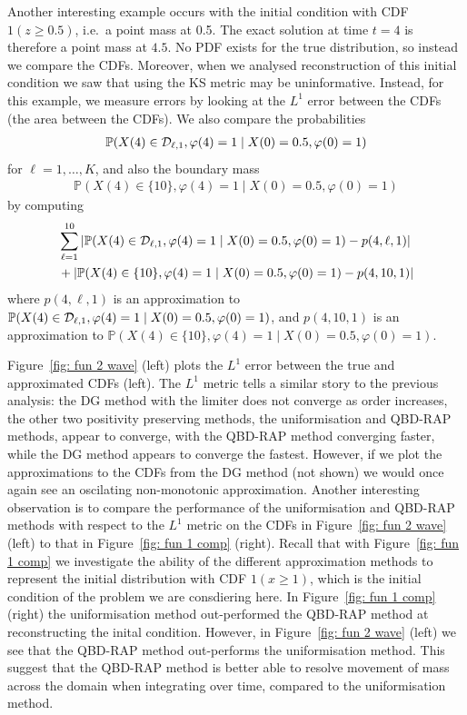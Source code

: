 \begin{example}Another interesting example occurs with the initial condition with CDF \(1(z\geq 0.5)\), i.e.~a point mass at 0.5. The exact solution at time \(t=4\) is therefore a point mass at \(4.5\). No PDF exists for the true distribution, so instead we compare the CDFs. Moreover, when we analysed reconstruction of this initial condition we saw that using the KS metric may be uninformative. Instead, for this example, we measure errors by looking at the \(L^1\) error between the CDFs (the area between the CDFs). We also compare the probabilities
\begin{align}
	\mathbb P(X(4)\in\mathcal{D}_{\ell,1}, \varphi(4)=1\mid X(0)=0.5,\varphi(0)=1) \label{eqn: cell probs}
\end{align}
for \(\ell=1,\dots,K\), and also the boundary mass
\begin{align}
	\mathbb P(X(4)\in\{10\}, \varphi(4)=1\mid X(0)=0.5,\varphi(0)=1) \label{eqn: cell probs boundary}
\end{align}
by computing 
\begin{align}
	&\sum_{\ell=1}^{10} \left|\mathbb P(X(4)\in\mathcal{D}_{\ell,1}, \varphi(4)=1\mid X(0)=0.5,\varphi(0)=1)-p(4,\ell,1)\right|
	\\&+\left|\mathbb P(X(4)\in\{10\}, \varphi(4)=1\mid X(0)=0.5,\varphi(0)=1)-p(4,10,1)\right| \label{eqn: cell errors}
\end{align}
where \(p(4,\ell,1)\) is an approximation to \(\mathbb P(X(4)\in\mathcal{D}_{\ell,1}, \varphi(4)=1\mid X(0)=0.5,\varphi(0)=1)\), and \(p(4,10,1)\) is an approximation to \(\mathbb P(X(4)\in\{10\}, \varphi(4)=1\mid X(0)=0.5,\varphi(0)=1)\).

Figure~\ref{fig: fun 2 wave} (left) plots the \(L^1\) error between the true and approximated CDFs (left). The \(L^1\) metric tells a similar story to the previous analysis: the DG method with the limiter does not converge as order increases, the other two positivity preserving methods, the uniformisation and QBD-RAP methods, appear to converge, with the QBD-RAP method converging faster, while the DG method appears to converge the fastest. However, if we plot the approximations to the CDFs from the DG method (not shown) we would once again see an oscilating non-monotonic approximation. Another interesting observation is to compare the performance of the uniformisation and QBD-RAP methods with respect to the \(L^1\) metric on the CDFs in Figure~\ref{fig: fun 2 wave} (left) to that in Figure~\ref{fig: fun 1 comp} (right). Recall that with Figure~\ref{fig: fun 1 comp} we investigate the ability of the different approximation methods to represent the initial distribution with CDF \(1(x\geq 1)\), which is the initial condition of the problem we are consdiering here. In Figure~\ref{fig: fun 1 comp} (right) the uniformisation method out-performed the QBD-RAP method at reconstructing the inital condition. However, in Figure~\ref{fig: fun 2 wave} (left) we see that the QBD-RAP method out-performs the uniformisation method. This suggest that the QBD-RAP method is better able to resolve movement of mass across the domain when integrating over time, compared to the uniformisation method.  


\end{example}
